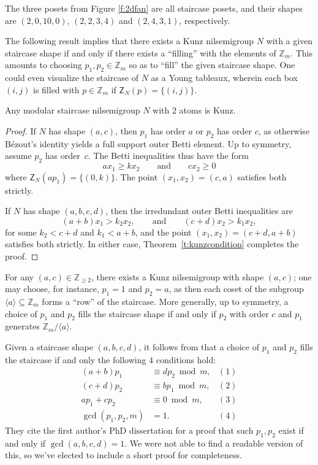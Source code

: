 \documentclass[ALCO, Unicode]{cedram}
\newcommand\ZZ{\mathbb{Z}}
\begin{document}
\begin{exam}\label{e:2gen}
The three posets from Figure \ref{f:2dfan} are all staircase posets, and their shapes are $(2,0,10,0)$, $(2,2,3,4)$ and $(2,4,3,1)$, respectively.  
\end{exam}

The following result implies that there exists a Kunz nilsemigroup $N$ with a given staircase shape if and only if there exists a ``filling'' with the elements of $\ZZ_m$.  
This amounts to choosing $p_1, p_2 \in \ZZ_m$ so as to ``fill'' the given staircase shape.  
One could even visualize the staircase of $N$ as a Young tableaux, wherein each box $(i,j)$ is filled with $p \in \ZZ_m$ if $\mathsf{Z}_N(p) = \{(i,j)\}$.  


\begin{prop}\label{p:2genallkunz}
Any modular staircase nilsemigroup $N$ with $2$ atoms is Kunz.
\end{prop}

\begin{proof}
If $N$ has shape $(a,c)$, then $p_1$ has order $a$ or $p_2$ has order $c$, as otherwise B\'ezout's identity yields a full support outer Betti element.  Up to symmetry, assume $p_2$ has order~$c$.  The Betti inequalities thus have the form 
\[
ax_1 \ge kx_2
\qquad \text{and} \qquad
cx_2 \ge 0
\]
where $\mathsf Z_N(ap_1) = \{(0,k)\}$.  The point $(x_1,x_2) = (c,a)$ satisfies both strictly.  

If $N$ has shape $(a,b,c,d)$,
then the irredundant outer Betti inequalities are 
\[
(a+b)x_1 > k_2x_2,
\qquad \text{and} \qquad
(c+d)x_2 > k_1x_2,
\]
for some $k_2 < c + d$ and $k_1 < a+b$,
and the point $(x_1, x_2) = (c+d, a+b)$ satisfies both strictly.  In either case, Theorem~\ref{t:kunzcondition} completes the proof.  
\end{proof}

For any $(a, c) \in \ZZ_{\ge 2}$, there exists a Kunz nilsemigroup with shape $(a,c)$; one may choose, for instance, $p_1 = 1$ and $p_2 = a$, as then each coset of the subgroup $\langle a \rangle \subseteq \ZZ_m$ forms a ``row'' of the staircase.  More generally, up to symmetry, a choice of $p_1$ and $p_2$ fills the staircase shape if and only if $p_2$ with order $c$ and $p_1$ generates $\ZZ_m/\langle a \rangle$.  

Given a staircase shape $(a,b,c,d)$, it follows from \cite[Section 4]{fioletal} that a choice of $p_1$ and $p_2$ fills the staircase if and only the following $4$ conditions hold:
\begin{align*}
(a+b)p_1 &\equiv dp_2 \bmod m, & (1) \\
(c+d)p_2 &\equiv bp_1 \bmod m, & (2) \\
ap_1 + cp_2 &\equiv 0 \bmod m, & (3) \\
\gcd(p_1,p_2,m) & = 1. & (4)
\end{align*}
They cite the first author's PhD dissertation for a proof that such $p_1,p_2$ exist if and only if $\gcd(a,b,c,d) = 1$. We were not able to find a readable version of this, so we've elected to include a short proof for completeness.  
\end{document}
